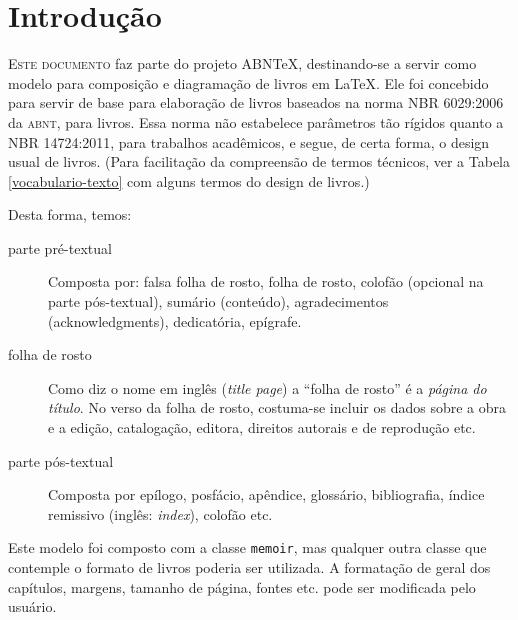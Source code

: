 \documentclass[
	10pt,				%
	openright,			%
	twoside,			%
	a5paper,			%
	english,			%
	french,				%
	spanish,			%
	brazil,				%
]{abntex2}
\begin{document}
\listoffigures*
\cleardoublepage

\listoftables*
\cleardoublepage

\tableofcontents*
\cleardoublepage


\mainmatter

\chapter*{Introdução}

\lettrine[nindent=0.35em,lhang=0.40,loversize=0.3]{E}{ste documento} faz parte
do projeto ABN\TeX, destinando-se a servir como modelo para composição e
diagramação de livros em \LaTeX. Ele foi concebido para servir de base para
elaboração de livros baseados na norma NBR 6029:2006 da \textsc{abnt}, para
livros. Essa norma não estabelece parâmetros tão rígidos quanto a NBR
14724:2011, para trabalhos acadêmicos, e segue, de certa forma, o design usual
de livros. (Para facilitação da compreensão de termos técnicos, ver a Tabela
\ref{vocabulario-texto} com alguns termos do design de livros.)

Desta forma, temos:

\begin{description}
\item[parte pré-textual] Composta por: falsa folha de rosto, folha de rosto,
colofão (opcional na parte pós-textual), sumário (conteúdo),
a\-gra\-de\-ci\-men\-tos (acknowledgments), dedicatória, epígrafe.
\item[folha de rosto] Como diz o nome em inglês (\textit{title page}) a “folha
de rosto” é a \textit{página do título}. No verso da folha de rosto, costuma-se
incluir os dados sobre a obra e a edição, catalogação, editora, direitos
autorais e de reprodução etc.
\item [parte pós-textual] Composta por epílogo, posfácio, apêndice, glossário,
bibliografia, índice remissivo (inglês: \textit{index}), colofão etc.

\end{description}

Este modelo foi composto com a classe \texttt{memoir}, mas qualquer outra classe que contemple o formato de livros poderia ser utilizada. A formatação de geral dos capítulos, margens, tamanho de página, fontes etc. pode ser modificada pelo usuário.
\end{document}
